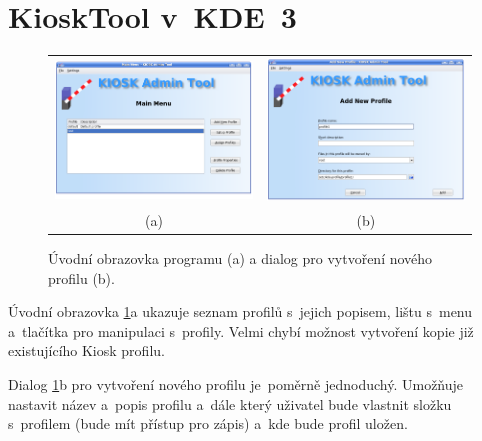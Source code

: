 \section{KioskTool v~KDE~3}
\begin{figure}[h]
\centering
\begin{tabular}{c c}
\includegraphics[width=7.2cm ,keepaspectratio]{obrazky/KioskToolKDE3/uvodni_obrazovka.png}&
\includegraphics[width=7.2cm ,keepaspectratio]{obrazky/KioskToolKDE3/novy_profil.png}\\
(a)&(b)\\
\end{tabular}
\caption{Úvodní obrazovka programu (a) a dialog pro vytvoření nového profilu (b).}
\label{fig_6}
\end{figure}

Úvodní obrazovka \ref{fig_6}a ukazuje seznam profilů s~jejich popisem, lištu s~menu a~tlačítka pro manipulaci s~profily. Velmi chybí možnost vytvoření kopie již existujícího Kiosk profilu.

Dialog \ref{fig_6}b pro vytvoření nového profilu je~poměrně jednoduchý. Umožňuje nastavit název a~popis profilu a~dále který uživatel bude vlastnit složku s~profilem (bude mít přístup pro zápis) a~kde bude profil uložen.

